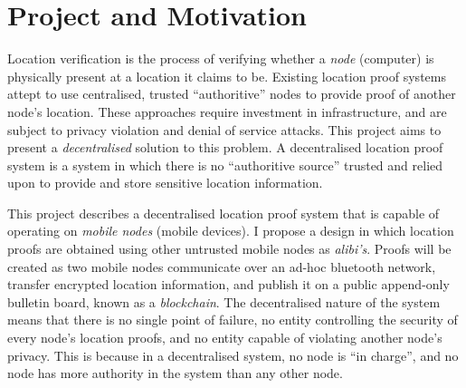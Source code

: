 \section{Project and Motivation}
Location verification is the process of verifying whether a \textit{node} (computer) is physically present at a location it claims to be. Existing location proof systems attept to use centralised, trusted ``authoritive'' nodes to provide proof of another node's location. These approaches require investment in infrastructure, and are subject to privacy violation and denial of service attacks. This project aims to present a \textit{decentralised} solution to this problem. A decentralised location proof system is a system in which there is no ``authoritive source'' trusted and relied upon to provide and store sensitive location information.

This project describes a decentralised location proof system that is capable of operating on \textit{mobile nodes} (mobile devices). I propose a design in which location proofs are obtained using other untrusted mobile nodes as \textit{alibi's}. Proofs will be created as two mobile nodes communicate over an ad-hoc bluetooth network, transfer encrypted location information, and publish it on a public append-only bulletin board, known as a \textit{blockchain}. The decentralised nature of the system means that there is no single point of failure, no entity controlling the security of every node's location proofs, and no entity capable of violating another node's privacy. This is because in a decentralised system, no node is ``in charge'', and no node has more authority in the system than any other node.